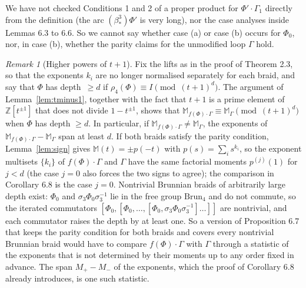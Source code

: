 \documentclass[11pt]{amsart}
\theoremstyle{remark}
\newtheorem{remark}[lemma]{Remark}
\newcommand{\M}{\mathbb{M}}
\newcommand{\Brun}{\mathrm{Brun}}
\newcommand{\bs}{\beta^3_*}
\begin{document}
We have not checked Conditions 1 and 2 of a proper product for $\Phi'\cdot\Gamma_1$ directly from the definition (the arc $(\bs)\Phi'$ is very long), nor the case analyses inside Lemmas 6.3 to 6.6. So we cannot say whether case (a) or case (b) occurs for $\Phi_0$, nor, in case (b), whether the parity claims for the unmodified loop $\Gamma$ hold.

\begin{remark}[Higher powers of $t+1$]
Fix the lifts as in the proof of Theorem 2.3, so that the exponents $k_i$ are no longer normalised separately for each braid, and say that $\Phi$ has depth~$\ge d$ if $\rho_4(\Phi)\equiv I\pmod{(t+1)^d}$. The argument of Lemma~\ref{lem:tminus1}, together with the fact that $t+1$ is a prime element of $\mathbb{Z}[t^{\pm1}]$ that does not divide $1-t^{\pm1}$, shows that $\M_{f(\Phi)\cdot\Gamma}\equiv\M_\Gamma\pmod{(t+1)^d}$ when $\Phi$ has depth $\ge d$. In particular, if $\M_{f(\Phi)\cdot\Gamma}\neq\M_\Gamma$, the exponents of $\M_{f(\Phi)\cdot\Gamma}-\M_\Gamma$ span at least $d$. If both braids satisfy the parity condition, Lemma~\ref{lem:sign} gives $\M(t)=\pm p(-t)$ with $p(s)=\sum_i s^{k_i}$, so the exponent multisets $\{k_i\}$ of $f(\Phi)\cdot\Gamma$ and $\Gamma$ have the same factorial moments $p^{(j)}(1)$ for $j<d$ (the case $j=0$ also forces the two signs to agree); the comparison in Corollary 6.8 is the case $j=0$. Nontrivial Brunnian braids of arbitrarily large depth exist: $\Phi_0$ and $\sigma_3\Phi_0\sigma_3^{-1}$ lie in the free group $\Brun_4$ and do not commute, so the iterated commutators $[\Phi_0,[\Phi_0,\dots,[\Phi_0,\sigma_3\Phi_0\sigma_3^{-1}]\dots]]$ are nontrivial, and each commutator raises the depth by at least one. So a version of Proposition 6.7 that keeps the parity condition for both braids and covers every nontrivial Brunnian braid would have to compare $f(\Phi)\cdot\Gamma$ with $\Gamma$ through a statistic of the exponents that is not determined by their moments up to any order fixed in advance. The span $M_+-M_-$ of the exponents, which the proof of Corollary 6.8 already introduces, is one such statistic.
\end{remark}
\end{document}
